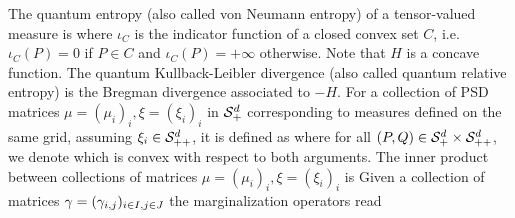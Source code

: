 The quantum entropy (also called von Neumann entropy) of a tensor-valued measure is 
where $\iota_C$ is the indicator function of a closed convex set $C$, i.e. $\iota_C(P)=0$ if $P \in C$ and $\iota_C(P)=+\infty$ otherwise.
Note that $H$ is a concave function. 
%
The quantum Kullback-Leibler divergence (also called quantum relative entropy) is the Bregman divergence associated to $-H$. For a collection of PSD matrices $\mu=(\mu_i)_i, \xi=(\xi_i)_i$ in $\mathcal{S}_+^d$ corresponding to measures defined on the same grid, assuming $\xi_i \in \mathcal{S}_{++}^d$, it is defined as
where for all $(P,Q) \in \mathcal{S}_{+}^d \times \mathcal{S}_{++}^d$, we denote
which is convex with respect to both arguments. 
%
The inner product between collections of matrices $\mu=(\mu_i)_i, \xi=(\xi_i)_i$ is 
Given a collection of matrices $\gamma=(\gamma_{i,j})_{i \in I,j \in J}$ the marginalization operators read
